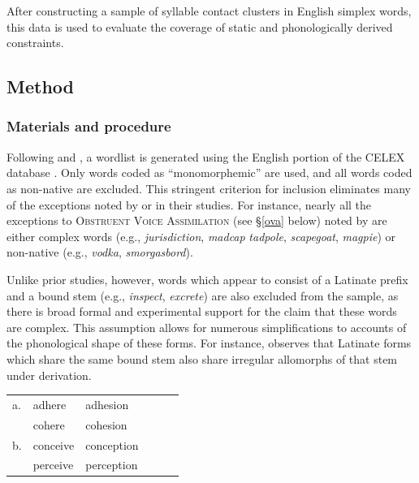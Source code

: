 After constructing a sample of syllable contact clusters in English simplex words, this data is used to evaluate the coverage of static and phonologically derived constraints.

\subsection{Method}

\subsubsection{Materials and procedure}

Following \citet[ chap.~8]{Duanmu2009} and \citet[ chap.~3]{Hammond1999a}, 
a wordlist is generated using the English portion of the CELEX database \citep{CELEX}. 
Only words coded as ``monomorphemic'' are used, and all words coded as non-native are excluded.
This stringent criterion for inclusion eliminates many of the exceptions noted by \citeauthor{Duanmu2009} or \citeauthor{Hammond1999a} in their studies. For instance, nearly all the exceptions to \textsc{Obstruent Voice Assimilation} (see \S\ref{ova} below) noted by \citet[74]{Hammond1999a} are 
either complex words (e.g., \emph{jurisdiction}, \emph{madcap} \emph{tadpole}, \emph{scapegoat}, \emph{magpie}) or non-native (e.g., \emph{vodka}, \emph{smorgasbord}).

Unlike prior studies, however, words which appear to consist of a Latinate prefix and a bound stem (e.g., \emph{inspect}, \emph{excrete}) are also excluded from the sample, as there is broad formal and experimental support for the claim that these words are complex.
This assumption allows for numerous simplifications to accounts of the phonological shape of these forms. 
For instance, \citet[11f.]{Aronoff1976} observes that Latinate forms which share the same bound stem also share irregular allomorphs of that stem under derivation. 

\begin{example}
\begin{tabular}{l l l l l l}
a. & {adhere}   & {adhesion}   \\
   & {cohere}   & {cohesion}   \\
b. & {conceive} & {conception} \\
   & {perceive} & {perception} \\
\end{tabular}
\end{example}

